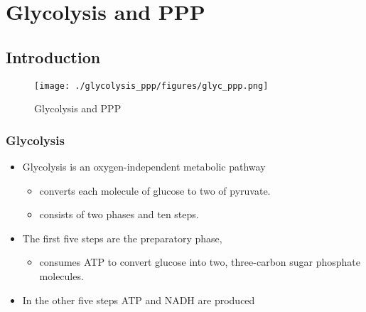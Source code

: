 \documentclass{scrartcl}
\begin{document}
\section{Glycolysis and PPP}
\label{sec:orga271b93}
\subsection{Introduction}
\label{sec:org76f0bf5}
\begin{figure}[htbp]
\centering
\texttt{[image: ./glycolysis\_ppp/figures/glyc\_ppp.png]}
\caption{\label{fig:org7a3aa2f}
Glycolysis and PPP}
\end{figure}

\subsubsection{Glycolysis}
\label{sec:org7fb1056}
\begin{itemize}
\item Glycolysis is an oxygen-independent metabolic pathway
\begin{itemize}
\item converts each molecule of glucose to two of pyruvate.
\item consists of two phases and ten steps.
\end{itemize}
\item The first five steps are the preparatory phase,
\begin{itemize}
\item consumes ATP to convert glucose into two, three-carbon sugar
phosphate molecules.
\end{itemize}
\item In the other five steps ATP and NADH are produced
\end{itemize}
\end{document}
